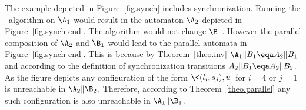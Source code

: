 \documentclass{eptcs}
\begin{document}
\begin{example}
\label{ex.synch}
The example depicted in Figure~\ref{fig.synch} includes synchronization.
Running the \cipm\ algorithm on $\A_1$ would result in the automaton $\A_2$
depicted in Figure~\ref{fig.synch-end}. The algorithm would not change $\B_1$.
However the parallel composition of $\A_2$ and $\B_1$ would lead to the
parallel automata in Figure~\ref{fig.synch-end}. This is because by
Theorem~\ref{theo.inv} $\A_1\| B_1\eqa A_2\| B_1 $ and according to the
definition of synchronization transitions $A_2\| B_1 \eqa A_2\| B_2$.  As the
figure depicts any configuration of the form $\<(l_i,s_j),u\>$ for $i=4$ or
$j=1$ is unreachable in $\A_2\| \B_2$.  Therefore, according to
Theorem~\ref{theo.parallel} any such configuration is also unreachable in
$\A_1\| \B_1$.







\end{example}
\end{document}
